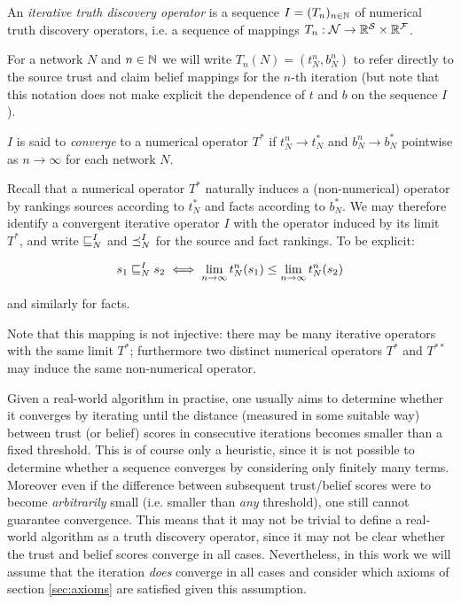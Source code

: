 \documentclass[../main.tex]{subfiles}
\begin{document}
\begin{definition}
\label{def:iterative_operator}

An \emph{iterative truth discovery operator} is a sequence $I=(T_n)_{n \in
\mathbb{N}}$ of numerical truth discovery operators, i.e. a sequence of mappings $T_n
: \mathcal{N} \rightarrow \mathbb{R}^{\mathcal{S}} \times \mathbb{R}^{\mathcal{F}}$.

For a network $N$ and $n \in \mathbb{N}$ we will write $T_n(N) = (t_N^n, b_N^n)$ to
refer directly to the source trust and claim belief mappings for the $n$-th
iteration (but note that this notation does not make explicit the dependence of
$t$ and $b$ on the sequence $I$).

$I$ is said to \emph{converge} to a numerical operator $T^*$ if $t_N^n
\rightarrow t_N^*$ and $b_N^n \rightarrow b_N^*$ pointwise as $n \rightarrow
\infty$ for each network $N$.

\end{definition}

\begin{remark}
Recall that a numerical operator $T^*$ naturally induces a (non-numerical)
operator by rankings sources according to $t_N^*$ and facts according to
$b_N^*$. We may therefore identify a convergent iterative operator $I$ with the
operator induced by its limit $T^*$, and write $\sqsubseteq_N^I$ and $\preceq_N^I$ for
the source and fact rankings. To be explicit:

$$ s_1 \sqsubseteq_N^I s_2 \iff \lim_{n \rightarrow \infty}{t_N^n(s_1)} \le \lim_{n
\rightarrow \infty}{t_N^n(s_2)} $$

and similarly for facts.

Note that this mapping is not injective: there may be many iterative operators
with the same limit $T^*$; furthermore two distinct numerical operators $T^*$
and $T^{**}$ may induce the same non-numerical operator.
\end{remark}

Given a real-world algorithm in practise, one usually aims to determine whether
it converges by iterating until the distance (measured in some suitable way)
between trust (or belief) scores in consecutive iterations becomes smaller than
a fixed threshold. This is of course only a heuristic, since it is not possible
to determine whether a sequence converges by considering only finitely many
terms. Moreover even if the difference between subsequent trust/belief scores
were to become \emph{arbitrarily} small (i.e. smaller than \emph{any}
threshold), one still cannot guarantee convergence\footnotemark. This means
that it may not be trivial to define a real-world algorithm as a truth
discovery operator, since it may not be clear whether the trust and belief
scores converge in all cases. Nevertheless, in this work we will assume that
the iteration \emph{does} converge in all cases and consider which axioms of
section \ref{sec:axioms} are satisfied given this assumption.
\end{document}
